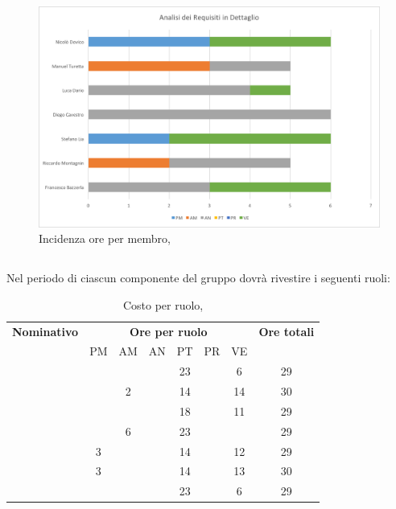\begin{figure}[H]
	\centering 
	\includegraphics[scale=0.7]{Immagini/GraficiPianoLavoro/ARD.png}
	\caption{Incidenza ore per membro, \ARD}
\end{figure}

\newpage
\subsection{\PA}
Nel periodo di \PA ciascun componente del gruppo dovrà rivestire i seguenti ruoli:

\begin{table}[h]
	\begin{center}
		\begin{tabular}{|c|c|c|c|c|c|c|c|}
			\hline
			\textbf{Nominativo} & \multicolumn{6}{c|}{\textbf{Ore per ruolo}} & \textbf{Ore totali} \\
					& PM & AM & AN & PT & PR & VE & \\
			\hline
			\FB		&	 &	  &	   & 23	&	 & 6  &	29	\\
			\hline
			\RM		&	 & 2  &	   & 14	&  	 & 14 & 30	\\
			\hline
			\SL		&	 &	  &	   & 18	&	 & 11 &	29	\\
			\hline
			\DC		&	 & 6  &	   & 23	&	 & 	  &	29	\\
			\hline
			\LD 	& 3	 &	  &	   & 14	&	 & 12 &	29	\\
			\hline
			\MT		& 3	 &	  &	   & 14	&	 & 13 &	30	\\
			\hline
			\ND 	&	 &	  &	   & 23	&	 & 6  & 29	\\
			\hline
		\end{tabular}
	\end{center}
	\caption{Costo per ruolo, \PA}
\end{table}

